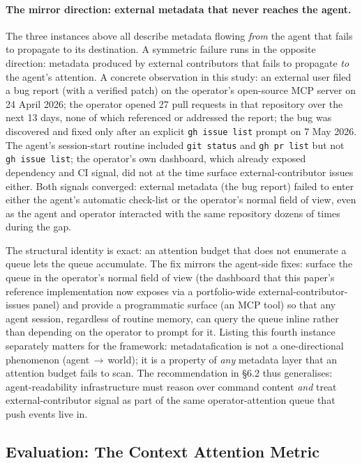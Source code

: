 \documentclass[sigconf, nonacm, anonymous=false]{acmart}
\begin{document}
\paragraph{The mirror direction: external metadata that never reaches the agent.}
The three instances above all describe metadata flowing \textit{from} the agent that fails to propagate to its destination. A symmetric failure runs in the opposite direction: metadata produced by external contributors that fails to propagate \textit{to} the agent's attention. A concrete observation in this study: an external user filed a bug report (with a verified patch) on the operator's open-source MCP server on 24 April 2026; the operator opened 27 pull requests in that repository over the next 13 days, none of which referenced or addressed the report; the bug was discovered and fixed only after an explicit \texttt{gh issue list} prompt on 7 May 2026. The agent's session-start routine included \texttt{git status} and \texttt{gh pr list} but not \texttt{gh issue list}; the operator's own dashboard, which already exposed dependency and CI signal, did not at the time surface external-contributor issues either. Both signals converged: external metadata (the bug report) failed to enter either the agent's automatic check-list or the operator's normal field of view, even as the agent and operator interacted with the same repository dozens of times during the gap.

The structural identity is exact: an attention budget that does not enumerate a queue lets the queue accumulate. The fix mirrors the agent-side fixes: surface the queue in the operator's normal field of view (the dashboard that this paper's reference implementation now exposes via a portfolio-wide external-contributor-issues panel) and provide a programmatic surface (an MCP tool) so that any agent session, regardless of routine memory, can query the queue inline rather than depending on the operator to prompt for it. Listing this fourth instance separately matters for the framework: metadatafication is not a one-directional phenomenon (agent\,$\to$\,world); it is a property of \textit{any} metadata layer that an attention budget fails to scan. The recommendation in §6.2 thus generalises: agent-readability infrastructure must reason over command content \textit{and} treat external-contributor signal as part of the same operator-attention queue that push events live in.

\subsection{Evaluation: The Context Attention Metric}
\end{document}
